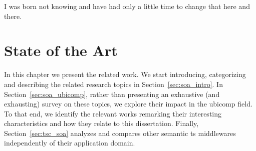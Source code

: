 
\begin{savequote}[50mm]
I was born not knowing and have had only a little time to change that here and there.
\end{savequote}


\chapter{State of the Art}
\label{cha:stateoftheart}
\newcommand{\pathchaptwo}{2_state_of_the_art}

\ifpdf
    \graphicspath{{\pathchaptwo/figures/PNG/}{\pathchaptwo/figures/PDF/}{\pathchaptwo/figures/}}
\else
    \graphicspath{{\pathchaptwo/figures/EPS/}{\pathchaptwo/figures/}}
\fi



In this chapter we present the related work.
We start introducing, categorizing and describing the related research topics in Section~\ref{sec:soa_intro}. %
In Section~\ref{sec:soa_ubicomp}, rather than presenting an exhaustive (and exhausting) survey on these topics, we explore their impact in the \ac{ubicomp} field. %
To that end, we identify the relevant works remarking their interesting characteristics and how they relate to this dissertation.
Finally, Section~\ref{sec:tsc_soa} analyzes and compares other semantic \ac{ts} middlewares independently of their application domain.












